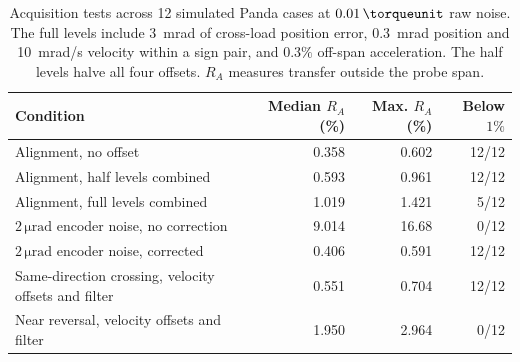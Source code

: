 
\begin{table}[!htbp]
\centering
\small
\setlength{\tabcolsep}{4pt}
\caption{Acquisition tests across 12 simulated Panda cases at \(0.01\,\torqueunit\) raw noise. The full levels include 3~mrad of cross-load position error, 0.3~mrad position and 10~mrad/s velocity within a sign pair, and \(0.3\%\) off-span acceleration. The half levels halve all four offsets. \(R_A\) measures transfer outside the probe span.}
\label{tab:acquisition}
\begin{tabular}{lrrr}
\toprule
Condition & Median \(R_A\) (\%) & Max. \(R_A\) (\%) & Below \(1\%\)\\
\midrule
Alignment, no offset & 0.358 & 0.602 & 12/12\\
Alignment, half levels combined & 0.593 & 0.961 & 12/12\\
Alignment, full levels combined & 1.019 & 1.421 & 5/12\\
\addlinespace
\(2\,\mathrm{\mu rad}\) encoder noise, no correction & 9.014 & 16.68 & 0/12\\
\(2\,\mathrm{\mu rad}\) encoder noise, corrected & 0.406 & 0.591 & 12/12\\
\addlinespace
Same-direction crossing, velocity offsets and filter & 0.551 & 0.704 & 12/12\\
Near reversal, velocity offsets and filter & 1.950 & 2.964 & 0/12\\
\bottomrule
\end{tabular}
\end{table}
